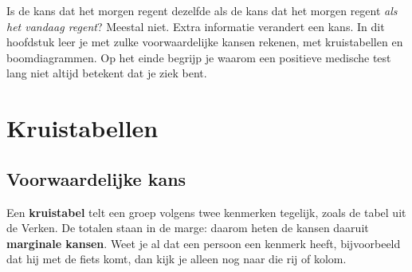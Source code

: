 %



Is de kans dat het morgen regent dezelfde als de kans dat het morgen regent \textit{als het vandaag regent}? Meestal niet. Extra informatie verandert een kans. In dit hoofdstuk leer je met zulke voorwaardelijke kansen rekenen, met kruistabellen en boomdiagrammen. Op het einde begrijp je waarom een positieve medische test lang niet altijd betekent dat je ziek bent.

\begin{oefeningen}[Start]

\end{oefeningen}


\section{Kruistabellen}

\subsection{Voorwaardelijke kans}

Een \textbf{kruistabel} telt een groep volgens twee kenmerken tegelijk, zoals de tabel uit de Verken. De totalen staan in de marge: daarom heten de kansen daaruit \textbf{marginale kansen}. Weet je al dat een persoon een kenmerk heeft, bijvoorbeeld dat hij met de fiets komt, dan kijk je alleen nog naar die rij of kolom.

